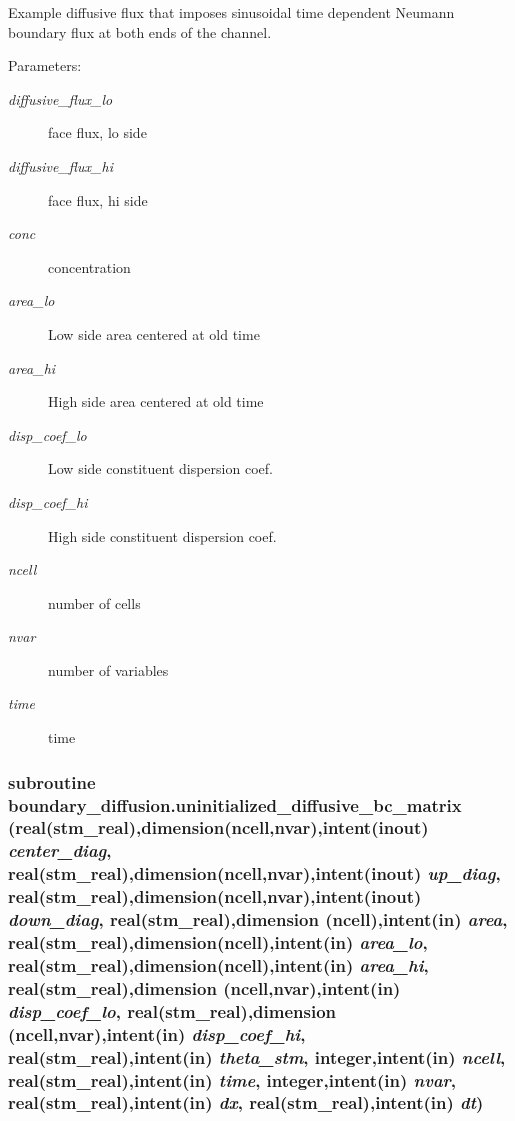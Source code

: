 Example diffusive flux that imposes sinusoidal time dependent Neumann boundary flux at both ends of the channel. 

\begin{Desc}
\item[Parameters:]
\begin{description}
\item[{\em diffusive\_\-flux\_\-lo}]face flux, lo side\item[{\em diffusive\_\-flux\_\-hi}]face flux, hi side\item[{\em conc}]concentration \item[{\em area\_\-lo}]Low side area centered at old time\item[{\em area\_\-hi}]High side area centered at old time\item[{\em disp\_\-coef\_\-lo}]Low side constituent dispersion coef.\item[{\em disp\_\-coef\_\-hi}]High side constituent dispersion coef.\item[{\em ncell}]number of cells\item[{\em nvar}]number of variables\item[{\em time}]time \end{description}
\end{Desc}
\hypertarget{a00054_6a67899a1c3944d943a1b2fb5aac2986}{
\subsubsection[{uninitialized\_\-diffusive\_\-bc\_\-matrix}]{\setlength{\rightskip}{0pt plus 5cm}subroutine boundary\_\-diffusion.uninitialized\_\-diffusive\_\-bc\_\-matrix (real(stm\_\-real),dimension(ncell,nvar),intent(inout) {\em center\_\-diag}, \/  real(stm\_\-real),dimension(ncell,nvar),intent(inout) {\em up\_\-diag}, \/  real(stm\_\-real),dimension(ncell,nvar),intent(inout) {\em down\_\-diag}, \/  real(stm\_\-real),dimension (ncell),intent(in) {\em area}, \/  real(stm\_\-real),dimension(ncell),intent(in) {\em area\_\-lo}, \/  real(stm\_\-real),dimension(ncell),intent(in) {\em area\_\-hi}, \/  real(stm\_\-real),dimension (ncell,nvar),intent(in) {\em disp\_\-coef\_\-lo}, \/  real(stm\_\-real),dimension (ncell,nvar),intent(in) {\em disp\_\-coef\_\-hi}, \/  real(stm\_\-real),intent(in) {\em theta\_\-stm}, \/  integer,intent(in) {\em ncell}, \/  real(stm\_\-real),intent(in) {\em time}, \/  integer,intent(in) {\em nvar}, \/  real(stm\_\-real),intent(in) {\em dx}, \/  real(stm\_\-real),intent(in) {\em dt})}}
\label{a00054_6a67899a1c3944d943a1b2fb5aac2986}


